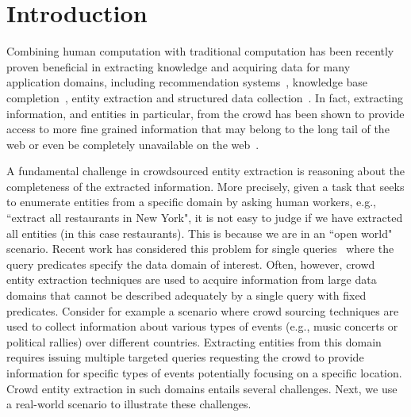 \documentclass{vldb}
\begin{document}
\section{Introduction}
\label{sec:intro}
Combining human computation with traditional computation has been recently proven beneficial in extracting knowledge and acquiring data for many application domains, including recommendation systems~\cite{amsterdamer:2014}, knowledge base completion~\cite{kondredi:2014}, entity extraction and structured data collection~\cite{trushkowsky:2013, park:2014}. In fact, extracting information, and entities in particular, from the crowd has been shown to provide access to more fine grained information that may belong to the long tail of the web or even be completely unavailable on the web~\cite{west:2014}.

A fundamental challenge in crowdsourced entity extraction is reasoning about the completeness of the extracted information. More precisely, given a task that seeks to enumerate entities from a specific domain by asking human workers, e.g., ``extract all restaurants in New York", it is not easy to judge if we have extracted all entities (in this case restaurants). This is because we are in an ``open world"~\cite{trushkowsky:2013} scenario. Recent work has considered this problem for single queries~\cite{trushkowsky:2013} where the query predicates specify the data domain of interest. Often, however, crowd entity extraction techniques are used to acquire information from large data domains that cannot be described adequately by a single query with fixed predicates. Consider for example a scenario where crowd sourcing techniques are used to collect information about various types of events (e.g., music concerts or political rallies) over different countries. Extracting entities from this domain requires issuing multiple targeted queries requesting the crowd to provide information for specific types of events potentially focusing on a specific location. Crowd entity extraction in such domains entails several challenges. Next, we use a real-world scenario to illustrate these challenges.
\end{document}
